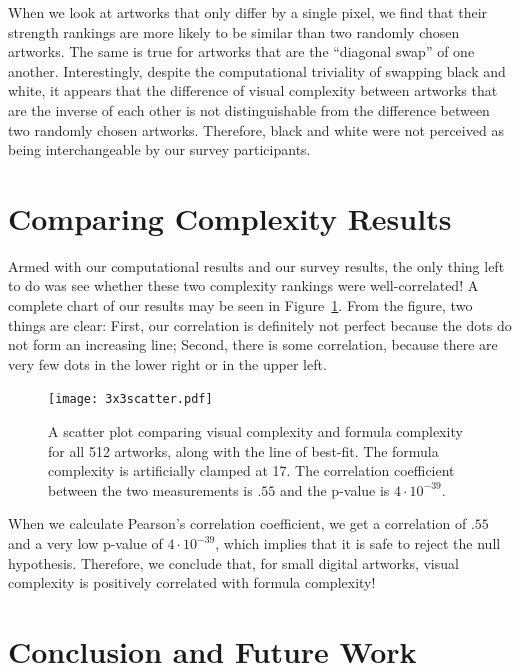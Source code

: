\documentclass[11pt]{article}
\begin{document}
When we look at artworks that only differ by a single pixel, we find that their
strength rankings are more likely to be similar than two randomly chosen
artworks.  The same is true for artworks that are the ``diagonal swap'' of one
another.  Interestingly, despite the computational triviality of swapping black
and white, it appears that the difference of visual complexity between artworks
that are the inverse of each other is not distinguishable from the difference
between two randomly chosen artworks.  Therefore, black and white were not
perceived as being interchangeable by our survey participants.

\section*{Comparing Complexity Results}

Armed with our computational results and our survey results, the only thing
left to do was see whether these two complexity rankings were well-correlated!
A complete chart of our results may be seen in Figure~\ref{fig:scatter}.  From
the figure, two things are clear: First, our correlation is definitely not
perfect because the dots do not form an increasing line; Second, there is some
correlation, because there are very few dots in the lower right or in the upper
left.

\begin{figure}
\begin{center}
\texttt{[image: 3x3scatter.pdf]}
\end{center}
\caption{A scatter plot comparing visual complexity and formula complexity for
all 512 artworks, along with the line of best-fit.  The formula complexity is
artificially clamped at 17.  The correlation coefficient between the two
measurements is $.55$ and the p-value is $4\cdot10^{-39}$.} 
\label{fig:scatter}
\end{figure}

When we calculate Pearson's correlation coefficient, we get a correlation of
$.55$ and a very low p-value of $4\cdot10^{-39}$, which implies that it is safe
to reject the null hypothesis.  Therefore, we conclude that, for small digital
artworks, visual complexity is positively correlated with formula complexity!  

\section*{Conclusion and Future Work}
\end{document}
